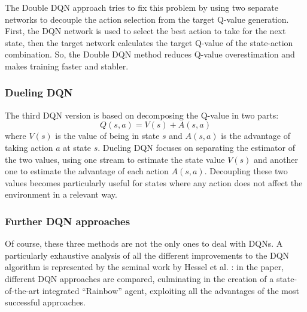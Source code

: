 \documentclass[a4paper, 12pt]{article}
\numberwithin{equation}{section}
\begin{document}
The Double DQN approach tries to fix this problem by using two separate networks to decouple the action selection from the target Q-value generation. First, the DQN network is used to select the best action to take for the next state, then the target network calculates the target Q-value of the state-action combination. So, the Double DQN method reduces Q-value overestimation and makes training faster and stabler.

\subsubsection{Dueling DQN}

The third DQN version is based on decomposing the Q-value in two parts:
\begin{equation}
	Q\left(s,a\right)=V\left(s\right)+A\left(s,a\right)
\end{equation}
where $V\left(s\right)$ is the value of being in state $s$ and $A\left(s,a\right)$ is the advantage of taking action $a$ at state $s$. Dueling DQN focuses on separating the estimator of the two values, using one stream to estimate the state value $V\left(s\right)$ and another one to estimate the advantage of each action $A\left(s,a\right)$. Decoupling these two values becomes particularly useful for states where any action does not affect the environment in a relevant way.

\subsubsection{Further DQN approaches}

Of course, these three methods are not the only ones to deal with DQNs. A particularly exhaustive analysis of all the different improvements to the DQN algorithm is represented by the seminal work by Hessel et al. \cite{rainbow}: in the paper, different DQN approaches are compared, culminating in the creation of a state-of-the-art integrated ``Rainbow'' agent, exploiting all the advantages of the most successful approaches.%


\end{document}
